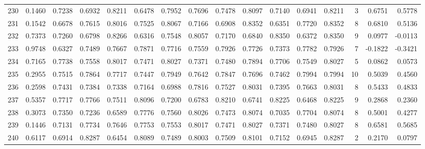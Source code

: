 \begin{tabular}{lrrrrrrrrrrrrrrr}
230 &      0.1460 &  0.7238 &  0.6932 &  0.8211 &  0.6478 &  0.7952 &  0.7696 &  0.7478 &  0.8097 &  0.7140 &   0.6941 &     0.8211 &      3 &                    0.6751 &                     0.5778 \\
231 &      0.1542 &  0.6678 &  0.7615 &  0.8016 &  0.7525 &  0.8067 &  0.7166 &  0.6908 &  0.8352 &  0.6351 &   0.7720 &     0.8352 &      8 &                    0.6810 &                     0.5136 \\
232 &      0.7373 &  0.7260 &  0.6798 &  0.8266 &  0.6316 &  0.7548 &  0.8057 &  0.7170 &  0.6840 &  0.8350 &   0.6372 &     0.8350 &      9 &                    0.0977 &                    -0.0113 \\
233 &      0.9748 &  0.6327 &  0.7489 &  0.7667 &  0.7871 &  0.7716 &  0.7559 &  0.7926 &  0.7726 &  0.7373 &   0.7782 &     0.7926 &      7 &                   -0.1822 &                    -0.3421 \\
234 &      0.7165 &  0.7738 &  0.7558 &  0.8017 &  0.7471 &  0.8027 &  0.7371 &  0.7480 &  0.7894 &  0.7706 &   0.7549 &     0.8027 &      5 &                    0.0862 &                     0.0573 \\
235 &      0.2955 &  0.7515 &  0.7864 &  0.7717 &  0.7447 &  0.7949 &  0.7642 &  0.7847 &  0.7696 &  0.7462 &   0.7994 &     0.7994 &     10 &                    0.5039 &                     0.4560 \\
236 &      0.2598 &  0.7431 &  0.7384 &  0.7338 &  0.7164 &  0.6988 &  0.7816 &  0.7527 &  0.8031 &  0.7395 &   0.7663 &     0.8031 &      8 &                    0.5433 &                     0.4833 \\
237 &      0.5357 &  0.7717 &  0.7766 &  0.7511 &  0.8096 &  0.7200 &  0.6783 &  0.8210 &  0.6741 &  0.8225 &   0.6468 &     0.8225 &      9 &                    0.2868 &                     0.2360 \\
238 &      0.3073 &  0.7350 &  0.7236 &  0.6589 &  0.7776 &  0.7560 &  0.8026 &  0.7473 &  0.8074 &  0.7035 &   0.7704 &     0.8074 &      8 &                    0.5001 &                     0.4277 \\
239 &      0.1446 &  0.7131 &  0.7734 &  0.7646 &  0.7753 &  0.7553 &  0.8017 &  0.7471 &  0.8027 &  0.7371 &   0.7480 &     0.8027 &      8 &                    0.6581 &                     0.5685 \\
240 &      0.6117 &  0.6914 &  0.8287 &  0.6454 &  0.8089 &  0.7489 &  0.8003 &  0.7509 &  0.8101 &  0.7152 &   0.6945 &     0.8287 &      2 &                    0.2170 &                     0.0797 \\

\end{tabular}
